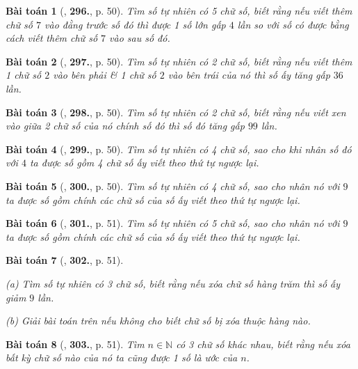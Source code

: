 \documentclass{article}
\numberwithin{equation}{section}
\newtheorem{baitoan}{Bài toán}
\begin{document}
\begin{baitoan}[\cite{Binh_Toan_6_tap_1}, \textbf{296.}, p. 50]
	Tìm số tự nhiên có 5 chữ số, biết rằng nếu viết thêm chữ số $7$ vào đằng trước số đó thì được 1 số lớn gấp $4$ lần so với số có được bằng cách viết thêm chữ số $7$ vào sau số đó.
\end{baitoan}

\begin{baitoan}[\cite{Binh_Toan_6_tap_1}, \textbf{297.}, p. 50]
	Tìm số tự nhiên có 2 chữ số, biết rằng nếu viết thêm 1 chữ số $2$ vào bên phải \& 1 chữ số $2$ vào bên trái của nó thì số ấy tăng gấp $36$ lần.
\end{baitoan}

\begin{baitoan}[\cite{Binh_Toan_6_tap_1}, \textbf{298.}, p. 50]
	Tìm số tự nhiên có 2 chữ số, biết rằng nếu viết xen vào giữa 2 chữ số của nó chính số đó thì số đó tăng gấp $99$ lần.
\end{baitoan}

\begin{baitoan}[\cite{Binh_Toan_6_tap_1}, \textbf{299.}, p. 50]
	Tìm số tự nhiên có 4 chữ số, sao cho khi nhân số đó với $4$ ta được số gồm 4 chữ số ấy viết theo thứ tự ngược lại.
\end{baitoan}

\begin{baitoan}[\cite{Binh_Toan_6_tap_1}, \textbf{300.}, p. 50]
	Tìm số tự nhiên có 4 chữ số, sao cho nhân nó với $9$ ta được số gồm chính các chữ số của số ấy viết theo thứ tự ngược lại.
\end{baitoan}

\begin{baitoan}[\cite{Binh_Toan_6_tap_1}, \textbf{301.}, p. 51]
	Tìm số tự nhiên có 5 chữ số, sao cho nhân nó với $9$ ta được số gồm chính các chữ số của số ấy viết theo thứ tự ngược lại.
\end{baitoan}

\begin{baitoan}[\cite{Binh_Toan_6_tap_1}, \textbf{302.}, p. 51]
	\begin{enumerate*}
		\item[(a)] Tìm số tự nhiên có 3 chữ số, biết rằng nếu xóa chữ số hàng trăm thì số ấy giảm $9$ lần.
		\item[(b)] Giải bài toán trên nếu không cho biết chữ số bị xóa thuộc hàng nào.
	\end{enumerate*}
\end{baitoan}

\begin{baitoan}[\cite{Binh_Toan_6_tap_1}, \textbf{303.}, p. 51]
	Tìm $n\in\mathbb{N}$ có 3 chữ số khác nhau, biết rằng nếu xóa bất kỳ chữ số nào của nó ta cũng được 1 số là ước của $n$.	
\end{baitoan}
\end{document}
